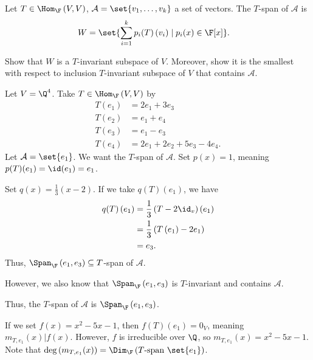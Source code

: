 \documentclass[10pt]{mypackage}
\begin{document}
\begin{definition}
  Let $T\in \Hom_{\F}\left(V,V\right)$, $\mathcal{A} = \set{v_1,\dots,v_k}$ a set of vectors. The $T$-span of $\mathcal{A}$ is
  \begin{align*}
    W &= \set{\sum_{i=1}^{k}p_i(T)\left(v_i\right)\mid p_i(x)\in \F[x]}.
  \end{align*}
\end{definition}
\begin{exercise}
  Show that $W$ is a $T$-invariant subspace of $V$. Moreover, show it is the smallest with respect to inclusion $T$-invariant subspace of $V$ that contains $\mathcal{A}$.
\end{exercise}
\begin{example}
  Let $V = \Q^4$. Take $T\in \Hom_{\F}\left(V,V\right)$ by
  \begin{align*}
    T\left(e_1\right) &= 2e_1 + 3e_3\\
    T\left(e_2\right) &= e_1 + e_4\\
    T\left(e_3\right) &= e_1 - e_3\\
    T\left(e_4\right) &= 2e_1 + 2e_2 + 5e_3 - 4e_4.
  \end{align*}
  Let $\mathcal{A} = \set{e_1}$. We want the $T$-span of $\mathcal{A}$. Set $p(x) = 1$, meaning $p(T)(e_1) = \id(e_1) = e_1$.\newline

  Set $q(x) = \frac{1}{3}\left(x-2\right)$. If we take $q(T)\left(e_1\right)$, we have
  \begin{align*}
    q(T)\left(e_1\right) &= \frac{1}{3}\left(T - 2\id_v\right)\left(e_1\right)\\
                         &= \frac{1}{3}\left(T\left(e_1\right) - 2e_1\right)\\
                         &= e_3.
  \end{align*}
  Thus, $\Span_{\F}\left(e_1,e_3\right)\subseteq T$-span of $\mathcal{A}$.\newline

  However, we also know that $\Span_{\F}\left(e_1,e_3\right)$ is $T$-invariant and contains $\mathcal{A}$.\newline

  Thus, the $T$-span of $\mathcal{A}$ is $\Span_{\F}\left(e_1,e_3\right)$.\newline

  If we set $f(x) = x^2 - 5x - 1$, then $f(T)\left(e_1\right) = 0_V$, meaning $m_{T,e_1}(x)|f(x)$. However, $f$ is irreducible over $\Q$, so $m_{T,e_1}(x) = x^2 - 5x - 1$. Note that $\deg\left(m_{T,e_1}(x)\right) = \Dim_{\F}\left(T\text{-span }\set{e_1}\right)$.
\end{example}
\end{document}
